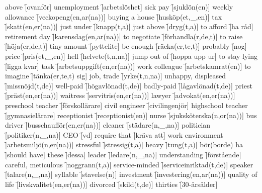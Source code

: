 \begin{questions}
\begin{multicols}{2}
        \question above \f[ovanför]
        \question unemployment \f[arbetslöshet]
        \question sick pay \f[sjuklön(en)]
        \question weekly allowance \f[veckopeng(en,ar(na))]
        \question buying a house \f[husköp(et,\_,en)]
        \question tax \f[skatt(en,er(na))]
        \question just under \f[knapp(t,a)]
        \question just above \f[dryg(t,a)]
        \question to afford \f[ha råd]
        \question retirement day \f[karensdag(en,ar(na))]
        \question to negotiate \f[förhandla(r,de,t)]
        \question to raise \f[höja(er,de,t)]
        \question tiny amount \f[pyttelite]
        \question be enough \f[räcka(er,te,t)]
        \question probably \f[nog]
        \question price \f[pris(et,\_,en)]
        \question hell \f[helvete(t,n,na)]
        \question jump out of \f[hoppa upp ur]
        \question to stay lying \f[ligga kvar]
        \question task \f[arbetsuppgift(en,er(na))]
        \question work colleague \f[arbetskamrat(en)]
        \question to imagine \f[tänka(er,te,t) sig]
        \question job, trade \f[yrke(t,n,na)]
        \question unhappy, displeased \f[missnöjd(t,de)]
        \question well-paid \f[högavlönad(t,de)]
        \question badly-paid \f[lågavlönad(t,de)]
        \question priest \f[präst(en,er(na))]
        \question waitress \f[servitris(en,er(na))]
        \question lawyer \f[advokat(en,er(na))]
        \question preschool teacher \f[förskollärare]
        \question civil engineer \f[civilingenjör]
        \question highschool teacher \f[gymnasielärare]
        \question receptionist \f[receptionist(en)]
        \question nurse \f[sjuksköterska(n,or(na))]
        \question bus driver \f[busschaufför(en,er(na))]
        \question cleaner \f[städare(n,\_,na)]
        \question politician \f[politiker(n,\_,na)]
        \question CEO \f[vd]
        \question require that \f[kräva att]
        \question work environment \f[arbetsmiljö(n,er(na))]
        \question stressful \f[stressig(t,a)]
        \question heavy \f[tung(t,a)]
        \question bör(borde) ha \f[should have]
        \question these \f[dessa]
        \question leader \f[ledare(n,\_,na)]
        \question understanding \f[förstående]
        \question careful, meticulous \f[noggrann(t,a)]
        \question service-minded \f[serviceinriktad(t,de)]
        \question speaker \f[talare(n,\_,na)]
        \question syllable \f[stavelse(n)]
        \question investment \f[investering(en,ar(na))]
        \question quality of life \f[livskvalitet(en,er(na))]
        \question divorced \f[skild(t,de)]
        \question thirties \f[30-årsålder]

\end{multicols}
\end{questions}
